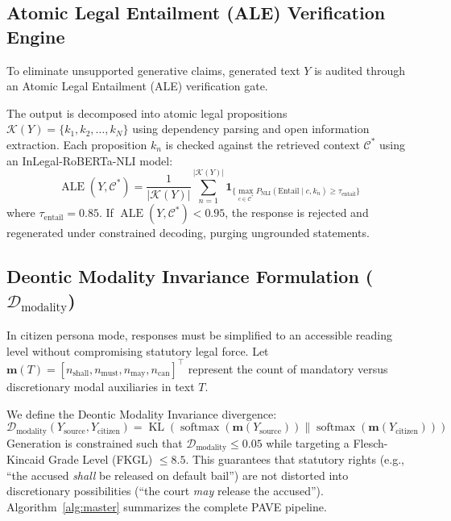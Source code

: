 \documentclass[conference]{IEEEtran}
\begin{document}
\subsection{Atomic Legal Entailment (ALE) Verification Engine}
To eliminate unsupported generative claims, generated text $Y$ is audited through an Atomic Legal Entailment (ALE) verification gate. 

The output is decomposed into atomic legal propositions $\mathcal{K}(Y) = \{k_1, k_2, \dots, k_N\}$ using dependency parsing and open information extraction. Each proposition $k_n$ is checked against the retrieved context $\mathcal{C}^*$ using an InLegal-RoBERTa-NLI model:
\begin{equation}
\operatorname{ALE}(Y, \mathcal{C}^*) = \frac{1}{|\mathcal{K}(Y)|} \sum_{n=1}^{|\mathcal{K}(Y)|} \mathbf{1}_{\{\max_{c \in \mathcal{C}^*} P_{\text{NLI}}(\text{Entail} \mid c, k_n) \ge \tau_{\text{entail}}\}}
\end{equation}
where $\tau_{\text{entail}} = 0.85$. If $\operatorname{ALE}(Y, \mathcal{C}^*) < 0.95$, the response is rejected and regenerated under constrained decoding, purging ungrounded statements.

\subsection{Deontic Modality Invariance Formulation ($\mathcal{D}_{\text{modality}}$)}
In citizen persona mode, responses must be simplified to an accessible reading level without compromising statutory legal force. Let $\mathbf{m}(T) = [n_{\text{shall}}, n_{\text{must}}, n_{\text{may}}, n_{\text{can}}]^\top$ represent the count of mandatory versus discretionary modal auxiliaries in text $T$. 

We define the Deontic Modality Invariance divergence:
\begin{equation}
\mathcal{D}_{\text{modality}}(Y_{\text{source}}, Y_{\text{citizen}}) = \operatorname{KL}\left( \operatorname{softmax}(\mathbf{m}(Y_{\text{source}})) \parallel \operatorname{softmax}(\mathbf{m}(Y_{\text{citizen}})) \right)
\end{equation}
Generation is constrained such that $\mathcal{D}_{\text{modality}} \le 0.05$ while targeting a Flesch-Kincaid Grade Level (FKGL) $\le 8.5$. This guarantees that statutory rights (e.g., ``the accused \textit{shall} be released on default bail'') are not distorted into discretionary possibilities (``the court \textit{may} release the accused''). Algorithm~\ref{alg:master} summarizes the complete PAVE pipeline.
\end{document}
